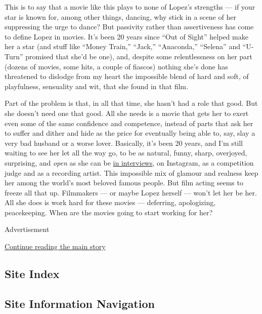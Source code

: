 This is to say that a movie like this plays to none of Lopez's strengths
--- if your star is known for, among other things, dancing, why stick in
a scene of her suppressing the urge to dance? But passivity rather than
assertiveness has come to define Lopez in movies. It's been 20 years
since ``Out of Sight'' helped make her a star (and stuff like ``Money
Train,'' ``Jack,'' ``Anaconda,'' ``Selena'' and ``U-Turn'' promised that
she'd be one), and, despite some relentlessness on her part (dozens of
movies, some hits, a couple of fiascos) nothing she's done has
threatened to dislodge from my heart the impossible blend of hard and
soft, of playfulness, sensuality and wit, that she found in that film.

Part of the problem is that, in all that time, she hasn't had a role
that good. But she doesn't need one that good. All she needs is a movie
that gets her to exert even some of the same confidence and competence,
instead of parts that ask her to suffer and dither and hide as the price
for eventually being able to, say, slay a very bad husband or a worse
lover. Basically, it's been 20 years, and I'm still waiting to see her
let all the way go, to be as natural, funny, sharp, overjoyed,
surprising, and \emph{open} as she can be
\href{https://www.hollywoodreporter.com/news/jennifer-lopez-directing-comedy-world-dance-interview-1114022}{in
interviews}, on Instagram, as a competition judge and as a recording
artist. This impossible mix of glamour and realness keep her among the
world's most beloved famous people. But film acting seems to freeze all
that up. Filmmakers --- or maybe Lopez herself --- won't let her be her.
All she does is work hard for these movies --- deferring, apologizing,
peacekeeping. When are the movies going to start working for her?

Advertisement

\protect\hyperlink{after-bottom}{Continue reading the main story}

\hypertarget{site-index}{%
\subsection{Site Index}\label{site-index}}

\hypertarget{site-information-navigation}{%
\subsection{Site Information
Navigation}\label{site-information-navigation}}

